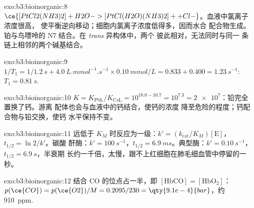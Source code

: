 \begin{solution}{exo:b3:bioinorganic:8}
$\ce{[PtCl2(NH3)2] + H2O -> [PtCl(H2O)(NH3)2]+ + Cl-}$。血液中氯离子浓度很高，
使平衡逆向移动；细胞内氯离子浓度低得多，因而水合
配合物生成。铂与鸟嘌呤的 N7 结合。在 \textit{trans} 异构体中，两个
彼此相对，无法同时与同一
条链上相邻的两个碱基结合。
\end{solution}

\begin{solution}{exo:b3:bioinorganic:9}
$1/T_1 = 1/\qty{1.2}{s} + \qty{4.0}{L.mmol^{-1}.s^{-1}} \times \qty{0.10}{mmol/L} = 0.833 + 0.400 = \qty{1.23}{s^{-1}}$: $T_1 = \qty{0.81}{s}$.
\end{solution}

\begin{solution}{exo:b3:bioinorganic:10}
$K = K_{\mathrm{PbL}}/K_{\mathrm{CaL}} = 10^{18.0 - 10.7} = 10^{7.3} = \num{2e7}$：铅完全置换了钙。游离
配体也会与血液中的钙结合，使钙的浓度
降至危险的程度；钙配合物与铅交换，使钙
水平保持不变。
\end{solution}

\begin{solution}{exo:b3:bioinorganic:11}
远低于 $K_M$ 时反应为一级：$k' = (k_{\mathrm{cat}}/K_M)[\mathrm E]$，$t_{1/2} = \ln 2/k'$。碳酸
酐酶：$k' = \qty{100}{s^{-1}}$，$t_{1/2} = \qty{6.9}{ms}$。典型酶：$k' = \qty{0.10}{s^{-1}}$，$t_{1/2} = \qty{6.9}{s}$，半衰期
长约一千倍，太慢，跟不上红细胞在肺毛细血管中停留的一秒。
\end{solution}

\begin{solution}{exo:b3:bioinorganic:12}
结合 CO 的位点占一半，即 $[\mathrm{HbCO}] = [\mathrm{HbO_2}]$：$p(\ce{CO}) = p(\ce{O2})/M = 0.2095/230 = \qty{9.1e-4}{bar}$，约
\qty{910}{ppm}.
\end{solution}


